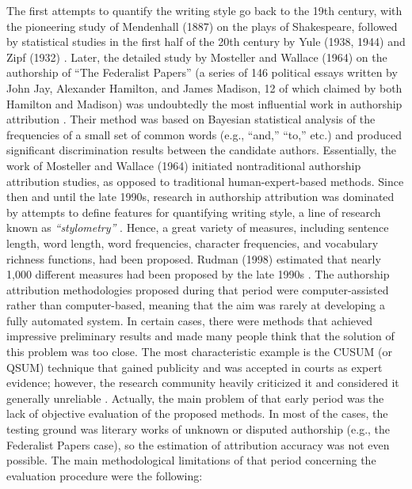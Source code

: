 The first attempts to quantify the writing style go back to the 19th century, with the pioneering study of Mendenhall (1887) on the plays of Shakespeare, followed
by statistical studies in the first half of the 20th century by Yule (1938, 1944) and Zipf (1932) \cite{williams1975mendenhall} \cite{yule1938test} \cite{zipf1932selected}. Later, the detailed study by Mosteller and Wallace (1964) on the authorship of “The
Federalist Papers” (a series of 146 political essays written by John Jay, Alexander Hamilton, and James Madison, 12 of which claimed by both Hamilton and Madison) was undoubtedly the most influential work in authorship attribution \cite{stamatatos2009survey}. Their method was based on Bayesian statistical analysis of the frequencies of a small set of common words (e.g., “and,” “to,” etc.) and produced significant discrimination results between the candidate authors.
Essentially, the work of Mosteller and Wallace (1964) initiated nontraditional authorship attribution studies, as opposed to traditional human-expert-based methods. Since
then and until the late 1990s, research in authorship attribution was dominated by attempts to define features for quantifying writing style, a line of research known as \textit{“stylometry”} \cite{holmes1998evolution}. Hence, a great variety of measures, including sentence length, word length, word frequencies, character frequencies, and vocabulary richness functions, had been proposed. Rudman (1998) estimated that
nearly 1,000 different measures had been proposed by the late 1990s \cite{rudman1997state}. The authorship attribution methodologies proposed during that period were computer-assisted rather than
computer-based, meaning that the aim was rarely at developing a fully automated system. In certain cases, there were methods that achieved impressive preliminary results and
made many people think that the solution of this problem was too close.
The most characteristic example is the CUSUM (or QSUM) technique \cite{michaelson1990qsum} that gained publicity and was accepted in courts as expert evidence; however, the research community heavily criticized it and considered it generally unreliable \cite{holmes1995forensic}. Actually, the main problem of that early period was the lack of objective evaluation of the proposed methods. In most of the cases, the testing ground was literary works of unknown or disputed authorship (e.g., the Federalist Papers
case), so the estimation of attribution accuracy was not even possible. The main methodological limitations of that period concerning the evaluation procedure were the following:

